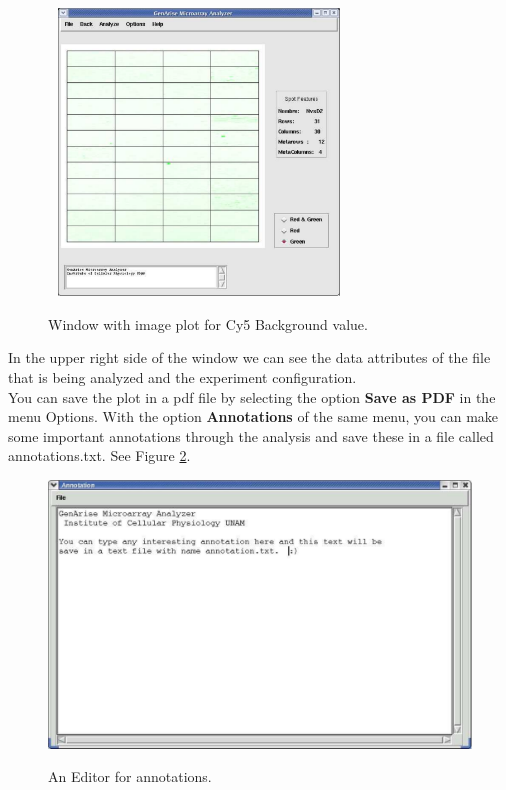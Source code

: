 \documentclass[12pt]{article}
\begin{document}
\textbf{\\\\}
\begin{figure}[h]
\begin{center}
\includegraphics[height=3in,width=3.15in]{./images/principalGreen.pdf}\\
\caption{Window with image plot for Cy5 Background value. \label{fig19}}
\end{center}
\end{figure}

In the upper right side of the window we can see the data attributes of the file that is being analyzed and the experiment configuration.\\
You can save the plot in a pdf file by selecting the option \textbf{Save as PDF} in the menu Options. With the option \textbf{Annotations} of the same menu, you can make some important annotations through the analysis and save these in a file called annotations.txt. See Figure \ref{fig20}.
\begin{figure}[h]
\begin{center}
\includegraphics[scale= 0.3]{./images/annotation.pdf}\\
\caption{An Editor for annotations. \label{fig20}}
\end{center}
\end{figure}
\end{document}
